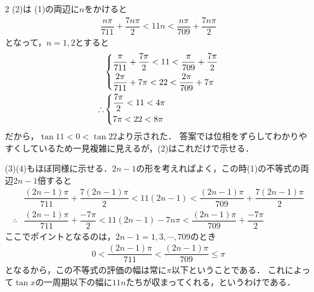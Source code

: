 \documentclass[../../main.tex]{subfiles}
\begin{document}
\begin{multicols}{2}
  (2)は
  (1)の両辺に$n$をかけると
  \begin{align}
    \dfrac{n\pi}{711} + \dfrac{7n\pi}{2} < 11n < \dfrac{n\pi}{709} + \dfrac{7n\pi}{2}
  \end{align}
  となって，$n=1,2$とすると
  \begin{align}
    &
    \begin{dcases}
      \dfrac{\pi}{711} + \dfrac{7\pi}{2} < 11 < \dfrac{\pi}{709} + \dfrac{7\pi}{2} \\
      \dfrac{2\pi}{711} + 7\pi < 22 < \dfrac{2\pi}{709} + 7\pi
    \end{dcases} \\
    \therefore
    &
    \begin{dcases}
      \dfrac{7\pi}{2} < 11 < 4\pi \\
      7\pi < 22 < 8\pi
    \end{dcases}
  \end{align}
  だから，$\tan 11 < 0 < \tan 22$より示された．
  答案では位相をずらしてわかりやすくしているため一見複雑に見えるが，(2)はこれだけで示せる．

  (3)(4)もほぼ同様に示せる．$2n-1$の形を考えればよく，この時(1)の不等式の両辺$2n-1$倍すると
  \begin{align}
    & \dfrac{(2n-1)\pi}{711} + \dfrac{7(2n-1)\pi}{2} < 11(2n-1) < \dfrac{(2n-1)\pi}{709} + \dfrac{7(2n-1)\pi}{2} \\
    \therefore
    & \dfrac{(2n-1)\pi}{711} + \dfrac{-7\pi}{2} < 11(2n-1) - 7n\pi < \dfrac{(2n-1)\pi}{709} + \dfrac{-7\pi}{2}
  \end{align}
  ここでポイントとなるのは，$2n-1=1,3,\cdots,709$のとき
  \begin{align}
    0< \dfrac{(2n-1)\pi}{711} < \dfrac{(2n-1)\pi}{709} \le \pi
  \end{align}
  となるから，この不等式の評価の幅は常に$\pi$以下ということである．
  これによって$\tan x$の一周期以下の幅に$11n$たちが収まってくれる，というわけである．

  \newpage
\end{multicols}
\end{document}
